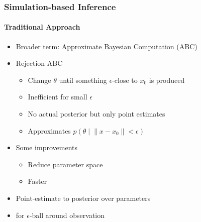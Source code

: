 \documentclass[9pt, aspectratio=169]{beamer}
\begin{document}
\begin{frame}
\frametitle{Simulation-based Inference}
\framesubtitle{Traditional Approach}
\begin{itemize}
	\item Broader term: Approximate Bayesian Computation (ABC)
		\item Rejection ABC
		\begin{itemize}
				\item Change $\theta$ until something $\epsilon$-close to $x_0$ is produced
				\item Inefficient for small $\epsilon$
				\item No actual posterior but only point estimates
				\item Approximates $p(\theta\mid \lVert x-x_0 \rVert < \epsilon)$
		\end{itemize}
	\item Some improvements \cite{marjoram2003markov, beaumont2009adaptive,bonassi2015sequential}
	\begin{itemize}
			\item Reduce parameter space
			\item Faster
	\end{itemize}
	\item Point-estimate to posterior over parameters
	\item for $\epsilon$-ball around observation
	
\end{itemize}
\end{frame} 
\end{document}
